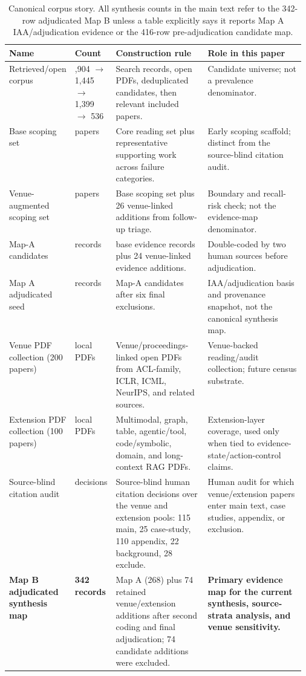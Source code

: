 \begin{table}[t]
\centering
\scriptsize
\renewcommand{\arraystretch}{0.88}
\begin{tabularx}{\linewidth}{>{\raggedright\arraybackslash}p{0.15\linewidth}>{\raggedright\arraybackslash}p{0.11\linewidth}>{\raggedright\arraybackslash}p{0.31\linewidth}X}
\toprule
\textbf{Name} & \textbf{Count} & \textbf{Construction rule} & \textbf{Role in this paper} \\
\midrule
Retrieved/open corpus & 1,904 $\rightarrow$ 1,445 $\rightarrow$ 1,399 $\rightarrow$ 536 & Search records, open PDFs, deduplicated candidates, then relevant included papers. & Candidate universe; not a prevalence denominator. \\
Base scoping set & 300 papers & Core reading set plus representative supporting work across failure categories. & Early scoping scaffold; distinct from the source-blind citation audit. \\
Venue-augmented scoping set & 326 papers & Base scoping set plus 26 venue-linked additions from follow-up triage. & Boundary and recall-risk check; not the evidence-map denominator. \\
Map-A candidates & 274 records & 250 base evidence records plus 24 venue-linked evidence additions. & Double-coded by two human sources before adjudication. \\
Map A adjudicated seed & 268 records & Map-A candidates after six final exclusions. & IAA/adjudication basis and provenance snapshot, not the canonical synthesis map. \\
Venue PDF collection (200 papers) & 200 local PDFs & Venue/proceedings-linked open PDFs from ACL-family, ICLR, ICML, NeurIPS, and related sources. & Venue-backed reading/audit collection; future census substrate. \\
Extension PDF collection (100 papers) & 100 local PDFs & Multimodal, graph, table, agentic/tool, code/symbolic, domain, and long-context RAG PDFs. & Extension-layer coverage, used only when tied to evidence-state/action-control claims. \\
Source-blind citation audit & 300 decisions & Source-blind human citation decisions over the venue and extension pools: 115 main, 25 case-study, 110 appendix, 22 background, 28 exclude. & Human audit for which venue/extension papers enter main text, case studies, appendix, or exclusion. \\
\textbf{Map B adjudicated synthesis map} & \textbf{342 records} & Map A (268) plus 74 retained venue/extension additions after second coding and final adjudication; 74 candidate additions were excluded. & \textbf{Primary evidence map for the current synthesis, source-strata analysis, and venue sensitivity.} \\
\bottomrule
\end{tabularx}
\caption{Canonical corpus story. All synthesis counts in the main text refer to the 342-row adjudicated Map B unless a table explicitly says it reports Map A IAA/adjudication evidence or the 416-row pre-adjudication candidate map.}
\label{tab:canonical-corpus-story}
\end{table}
